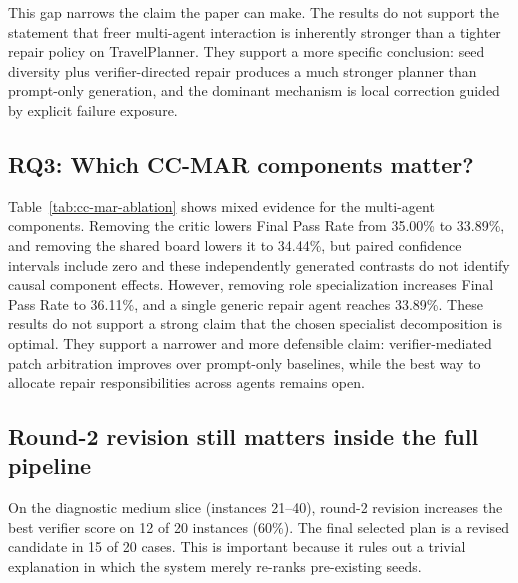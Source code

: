 \documentclass{article}
\begin{document}
This gap narrows the claim the paper can make. The results do not support the statement that freer multi-agent interaction is inherently stronger than a tighter repair policy on TravelPlanner. They support a more specific conclusion: seed diversity plus verifier-directed repair produces a much stronger planner than prompt-only generation, and the dominant mechanism is local correction guided by explicit failure exposure.

\subsection{RQ3: Which CC-MAR components matter?}
\begin{table}[t]
    \centering
    \caption{CC-MAR component ablations. The stored critic and shared-board contrasts show small numerical differences, but removing role specialization performs slightly better than the specialized-agent configuration. This negative result suggests that the current contract protocol is useful as controlled patch arbitration, while the particular role partition is not yet optimized.}
    \label{tab:cc-mar-ablation}
    \resizebox{0.78\linewidth}{!}{}
\end{table}

Table~\ref{tab:cc-mar-ablation} shows mixed evidence for the multi-agent components. Removing the critic lowers Final Pass Rate from 35.00\% to 33.89\%, and removing the shared board lowers it to 34.44\%, but paired confidence intervals include zero and these independently generated contrasts do not identify causal component effects. However, removing role specialization increases Final Pass Rate to 36.11\%, and a single generic repair agent reaches 33.89\%. These results do not support a strong claim that the chosen specialist decomposition is optimal. They support a narrower and more defensible claim: verifier-mediated patch arbitration improves over prompt-only baselines, while the best way to allocate repair responsibilities across agents remains open.

\subsection{Round-2 revision still matters inside the full pipeline}
On the diagnostic medium slice (instances 21--40), round-2 revision increases the best verifier score on 12 of 20 instances (60\%). The final selected plan is a revised candidate in 15 of 20 cases. This is important because it rules out a trivial explanation in which the system merely re-ranks pre-existing seeds.
\end{document}
